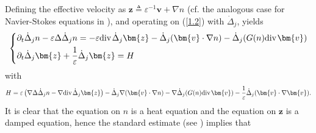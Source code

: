\documentclass{amsart}
\theoremstyle{definition}
\theoremstyle{remark}
\numberwithin{equation}{section}
\def\d{\partial}
\def\ddj{\dot \Delta_j}
\def\dB{{\dot {B}}}
\renewcommand{\div}{\mbox{\rm div}\;\!}
\def\tL{\widetilde{L}}
\def\bz{{\bm{z} }}
\def\bv{{\bm{v} }}
\begin{document}
Defining the effective velocity as $\bz\triangleq \varepsilon^{-1}\bv+\nabla n$ (cf. the analogous case for Navier-Stokes equations in \cite{Haspot2}), and operating on (\ref{1.2}) with $\ddj$, yields
\begin{equation}\label{2.1}
\begin{split}
\left\{\aligned
&\d_t \ddj n - \varepsilon\Delta \ddj n =- \varepsilon\div\ddj\bz- \ddj (\bv\cdot \nabla n)-\ddj(G(n)\div \bv)\\
&\d_t\ddj \bz+\frac{1}{\varepsilon} \ddj\bz = H
\endaligned\right.
\end{split}
\end{equation}
with
$$H=\varepsilon
\left(\nabla\Delta \ddj n-\nabla \div\ddj\bz\right)
- \ddj \nabla(\bv\cdot \nabla n)
-\nabla\ddj(G(n)\div \bv)
-\frac{1}{\varepsilon}\ddj(\bv\cdot\nabla\bv).$$
It is clear that the equation on $n$ is a heat equation and the equation on $\bz$ is a damped equation, hence the standard estimate (see \cite{BShouZhang,XuZhang}) implies that

\end{document}
